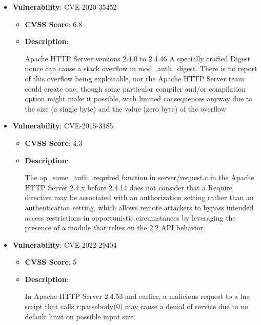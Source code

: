 \documentclass{article}
\begin{document}
\begin{itemize}
        \item \textbf{Vulnerability}: CVE-2020-35452
        \begin{itemize}
            \item \textbf{CVSS Score}:  6.8 
            \item \textbf{Description}:
            \parbox[t]{0.9\linewidth}{
                \ttfamily Apache HTTP Server versions 2.4.0 to 2.4.46 A specially crafted Digest nonce can cause a stack overflow in mod\_auth\_digest. There is no report of this overflow being exploitable, nor the Apache HTTP Server team could create one, though some particular compiler and/or compilation option might make it possible, with limited consequences anyway due to the size (a single byte) and the value (zero byte) of the overflow
            }
        \end{itemize}
    
        \item \textbf{Vulnerability}: CVE-2015-3185
        \begin{itemize}
            \item \textbf{CVSS Score}:  4.3 
            \item \textbf{Description}:
            \parbox[t]{0.9\linewidth}{
                \ttfamily The ap\_some\_auth\_required function in server/request.c in the Apache HTTP Server 2.4.x before 2.4.14 does not consider that a Require directive may be associated with an authorization setting rather than an authentication setting, which allows remote attackers to bypass intended access restrictions in opportunistic circumstances by leveraging the presence of a module that relies on the 2.2 API behavior.
            }
        \end{itemize}
    
        \item \textbf{Vulnerability}: CVE-2022-29404
        \begin{itemize}
            \item \textbf{CVSS Score}:  5 
            \item \textbf{Description}:
            \parbox[t]{0.9\linewidth}{
                \ttfamily In Apache HTTP Server 2.4.53 and earlier, a malicious request to a lua script that calls r:parsebody(0) may cause a denial of service due to no default limit on possible input size.
            }
        \end{itemize}
    

\end{itemize}
\end{document}
